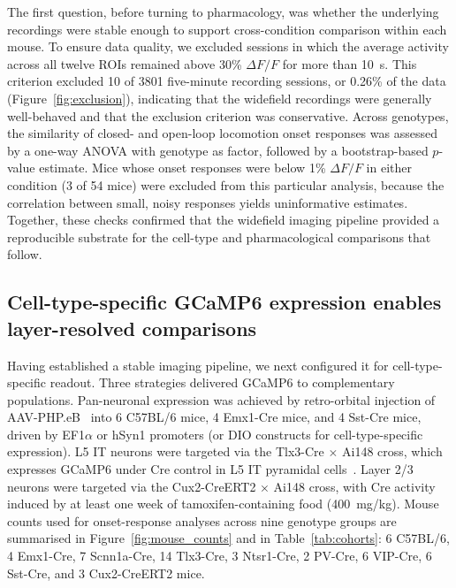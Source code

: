 \documentclass[11pt]{article}
\begin{document}
The first question, before turning to pharmacology, was whether the underlying recordings were stable enough to support cross-condition comparison within each mouse. To ensure data quality, we excluded sessions in which the average activity across all twelve ROIs remained above 30\% $\Delta F / F$ for more than 10~s. This criterion excluded 10 of 3801 five-minute recording sessions, or 0.26\% of the data (Figure~\ref{fig:exclusion}), indicating that the widefield recordings were generally well-behaved and that the exclusion criterion was conservative. Across genotypes, the similarity of closed- and open-loop locomotion onset responses was assessed by a one-way ANOVA with genotype as factor, followed by a bootstrap-based $p$-value estimate. Mice whose onset responses were below 1\% $\Delta F / F$ in either condition (3 of 54 mice) were excluded from this particular analysis, because the correlation between small, noisy responses yields uninformative estimates. Together, these checks confirmed that the widefield imaging pipeline provided a reproducible substrate for the cell-type and pharmacological comparisons that follow.

\subsection{Cell-type-specific GCaMP6 expression enables layer-resolved comparisons}

Having established a stable imaging pipeline, we next configured it for cell-type-specific readout. Three strategies delivered GCaMP6 to complementary populations. Pan-neuronal expression was achieved by retro-orbital injection of AAV-PHP.eB~\citep{chan2017engineered} into 6 C57BL/6 mice, 4 Emx1-Cre mice, and 4 Sst-Cre mice, driven by EF1$\alpha$ or hSyn1 promoters (or DIO constructs for cell-type-specific expression). L5 IT neurons were targeted via the Tlx3-Cre $\times$ Ai148 cross, which expresses GCaMP6 under Cre control in L5 IT pyramidal cells~\citep{daigle2018suite, liu2024celltype}. Layer 2/3 neurons were targeted via the Cux2-CreERT2 $\times$ Ai148 cross, with Cre activity induced by at least one week of tamoxifen-containing food (400~mg/kg). Mouse counts used for onset-response analyses across nine genotype groups are summarised in Figure~\ref{fig:mouse_counts} and in Table~\ref{tab:cohorts}: 6 C57BL/6, 4 Emx1-Cre, 7 Scnn1a-Cre, 14 Tlx3-Cre, 3 Ntsr1-Cre, 2 PV-Cre, 6 VIP-Cre, 6 Sst-Cre, and 3 Cux2-CreERT2 mice.
\end{document}
